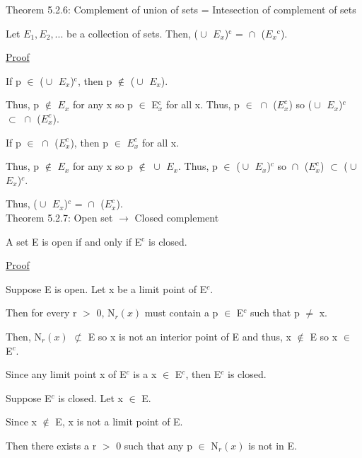 { \color{red} Theorem 5.2.6: Complement of union of sets = Intesection of complement of sets } 
	
	\begin{adjustbox}{minipage=14cm, right}
		Let $E_1, E_2 , ... $ be a collection of sets. Then,
		($\cup_{}^{}$ $E_x$)$^\text{c}$ = $\cap_{}^{}$ ($E_x$$^\text{c}$).
	\end{adjustbox}

{ \color{magenta} \underline{Proof} } 
	
	If p $\in$ ($\cup_{}^{}$ $E_x$)$^\text{c}$, then p $\not \in$ ($\cup_{}^{}$ $E_x$).

	Thus, p $\not \in$ $E_x$ for any x so p $\in$ E$_x^\text{c}$ for all x.
	Thus, p $\in$ $\cap_{}^{}$ ($E_x^c$) so
	($\cup_{}^{}$ $E_x$)$^c$ $\subset$ $\cap_{}^{}$ ($E_x^c$).

	If p $\in$ $\cap_{}^{}$ ($E_x^c$), then p $\in$ $E_x^c$ for all x.
	
	Thus, p $\not \in$ $E_x$ for any x so p $\not \in$ $\cup_{}^{}$ $E_x$.
	Thus, p $\in$ ($\cup_{}^{}$ $E_x$)$^c$ so
	$\cap_{}^{}$ ($E_x^c$) $\subset$ ($\cup_{}^{}$ $E_x$)$^c$.

	Thus, ($\cup_{}^{}$ $E_x$)$^c$ = $\cap_{}^{}$ ($E_x^c$). \\

{ \color{red} Theorem 5.2.7: Open set $\rightarrow$ Closed complement  } 

	\begin{adjustbox}{minipage=14cm, right}
		A set E is open if and only if E$^\text{c}$ is closed.
	\end{adjustbox}

{ \color{magenta} \underline{Proof} } 

	Suppose E is open. Let x be a limit point of E$^c$.

	Then for every r $>$ 0, N$_r(x)$ must contain a p $\in$ E$^c$ such that p $\neq$ x.

	Then, N$_r(x)$ $\not \subset$ E so x is not an interior point of E and
	thus, x $\not \in$ E so x $\in$ E$^c$.

	Since any limit point x of E$^c$ is a x $\in$ E$^c$, then E$^c$ is closed.

	\vspace{0.2cm}

	Suppose E$^c$ is closed. Let x $\in$ E.

	Since x $\not \in$ E, x is not a limit point of E.

	Then there exists a r $>$ 0 such that any p $\in$ N$_r(x)$ is not in E.

